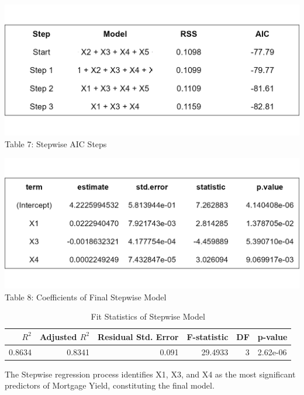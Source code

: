 \documentclass[
  11pt,
]{article}
\begin{document}
\begin{minipage}{0.48\textwidth}
\centering
\includegraphics[width=\linewidth]{stepwise_aic_table.png}
\vspace{0.3em}
\small Table 7: Stepwise AIC Steps
\end{minipage}
\hfill
\begin{minipage}{0.48\textwidth}
\centering
\includegraphics[width=\linewidth]{stepwise_coef_table.png}\\
\small Table 8: Coefficients of Final Stepwise Model
\end{minipage}

\addtocounter{table}{2}

\begin{table}[!h]
\centering
\caption{\label{tab:unnamed-chunk-8}Fit Statistics of Stepwise Model}
\centering
\fontsize{8}{10}\selectfont
\begin{tabular}[t]{rrrrrl}
\toprule
$R^2$ & Adjusted $R^2$ & Residual Std. Error & F-statistic & DF & p-value\\
\midrule
0.8634 & 0.8341 & 0.091 & 29.4933 & 3 & 2.62e-06\\
\bottomrule
\end{tabular}
\end{table}

The Stepwise regression process identifies X1, X3, and X4 as the most
significant predictors of Mortgage Yield, constituting the final model.
\end{document}
